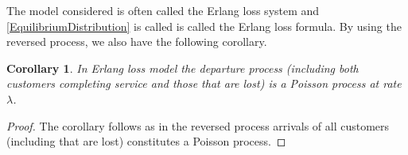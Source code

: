 \documentclass[a4paper,10pt]{article}
\theoremstyle{plain}
\newtheorem{cor}[thm]{Corollary}
\theoremstyle{definition}
\theoremstyle{remark}
\begin{document}
The model considered is often called the Erlang loss system and \ref{EquilibriumDistribution} is called is called the Erlang loss formula. By using the reversed process, we also have the following corollary.
\begin{cor}
In Erlang loss model the departure process (including both customers completing service and those that are lost) is a Poisson process at rate $\lambda$. 
\end{cor}
\begin{proof}
The corollary follows as in the reversed process arrivals of all customers (including that are lost) constitutes a Poisson process. 
\end{proof}
\end{document}
